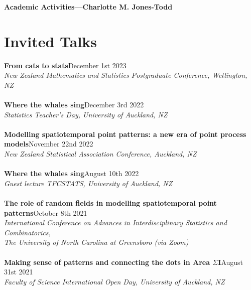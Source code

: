 \documentclass[10pt,letter]{article}
\begin{document}
\LARGE{\textbf{Academic Activities---Charlotte M. Jones-Todd}}

\normalsize

\noindent\makebox[\linewidth]{\rule{\paperwidth}{0.4pt}}

\section*{Invited Talks}
\vspace{1mm}
{\textbf{From cats to stats}}\hfill December 1st 2023\\
       {\sl New Zealand Mathematics and Statistics Postgraduate Conference, Wellington, NZ}\\
       \hdashrule[0.5ex]{4cm}{1pt}{1pt}\\
{\textbf{Where the whales sing}}\hfill December 3rd 2022\\
       {\sl Statistics Teacher's Day, University of Auckland, NZ}\\
       \hdashrule[0.5ex]{4cm}{1pt}{1pt}\\
{\textbf{Modelling spatiotemporal point patterns: a new era of point process \\ models}}\hfill November 22nd 2022\\
       {\sl New Zealand Statistical Association Conference, Auckland, NZ}\\
       \hdashrule[0.5ex]{4cm}{1pt}{1pt}\\
{\textbf{Where the whales sing}}\hfill August 10th 2022\\
       {\sl Guest lecture TFCSTATS, University of Auckland, NZ}\\
       \hdashrule[0.5ex]{4cm}{1pt}{1pt}\\
{\textbf{The role of random fields in modelling spatiotemporal point patterns}}\hfill October 8th 2021\\
       {\sl International Conference on Advances in Interdisciplinary Statistics and Combinatorics,\\ The University of North Carolina at Greensboro (via Zoom)}\\
       \hdashrule[0.5ex]{4cm}{1pt}{1pt}\\
 {\textbf{Making sense of patterns and connecting the dots in Area $\Sigma$I}}\hfill August 31st 2021\\
       {\sl Faculty of Science International Open Day, University of Auckland, NZ}\\
\end{document}
